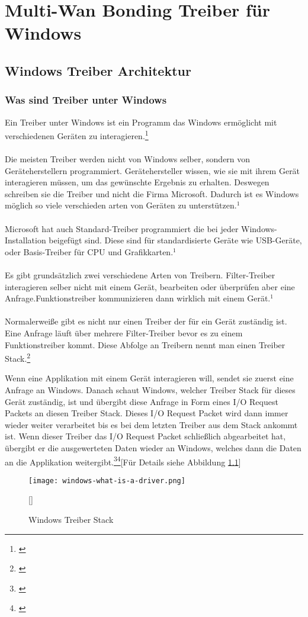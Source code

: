\chapter{Multi-Wan Bonding Treiber für Windows}
\label{chap:Treiber}

\section{Windows Treiber Architektur}
\subsection{Was sind Treiber unter Windows}
Ein Treiber unter Windows ist ein Programm das Windows ermöglicht mit verschiedenen Geräten zu interagieren.\footnote[1]{\cite[Vgl.][]{21}}
\\\\
Die meisten Treiber werden nicht von Windows selber, sondern von Geräteherstellern programmiert. Gerätehersteller wissen, wie sie mit ihrem Gerät interagieren müssen, um das gewünschte Ergebnis zu erhalten. Deswegen schreiben sie die Treiber und nicht die Firma Microsoft. Dadurch ist es Windows möglich so viele verschieden arten von Geräten zu unterstützen.$^{1}$
\\\\
Microsoft hat auch Standard-Treiber programmiert die bei jeder Windows-Installation beigefügt sind. Diese sind für standardisierte Geräte wie USB-Geräte, oder Basis-Treiber für CPU und Grafikkarten.$^{1}$
\\\\
Es gibt grundsätzlich zwei verschiedene Arten von Treibern. Filter-Treiber interagieren selber nicht mit einem Gerät, bearbeiten oder überprüfen aber eine Anfrage.Funktionstreiber kommunizieren dann wirklich mit einem Gerät.$^{1}$
\\\\
Normalerweiße gibt es nicht nur einen Treiber der für ein Gerät zuständig ist. Eine Anfrage läuft über mehrere Filter-Treiber bevor es zu einem Funktionstreiber kommt. Diese Abfolge an Treibern nennt man einen Treiber Stack.\footnote[2]{\cite[Vgl.][]{19}}

\newpage
\noindent
Wenn eine Applikation mit einem Gerät interagieren will, sendet sie zuerst eine Anfrage an Windows. Danach schaut Windows, welcher Treiber Stack für dieses Gerät zuständig, ist und übergibt diese Anfrage in Form eines I/O Request Packets an diesen Treiber Stack. Dieses I/O Request Packet wird dann immer wieder weiter verarbeitet bis es bei dem letzten Treiber aus dem Stack ankommt ist. Wenn dieser Treiber das I/O Request Packet schließlich abgearbeitet hat, übergibt er die ausgewerteten Daten wieder an Windows, welches dann die Daten an die Applikation weitergibt.\footnote[1]{\cite[Vgl.][]{19}}\footnote[2]{\cite[Vgl.][]{20}}[Für Details siehe Abbildung \ref{windows-driver-stack}]
\begin{figure}[H]
    \centering
    \texttt{[image: windows-what-is-a-driver.png]}
    \caption[Windows Treiber Stack]{Windows Treiber Stack}[\cite{20}]
    \label{windows-driver-stack} 
\end{figure}
\noindent

